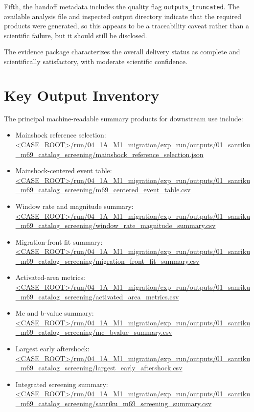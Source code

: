 \documentclass[11pt]{article}
\begin{document}
Fifth, the handoff metadata includes the quality flag \texttt{outputs\_truncated}. The available analysis file and inspected output directory indicate that the required products were generated, so this appears to be a traceability caveat rather than a scientific failure, but it should still be disclosed.

The evidence package characterizes the overall delivery status as complete and scientifically satisfactory, with moderate scientific confidence.

\section{Key Output Inventory}
The principal machine-readable summary products for downstream use include:
\begin{itemize}[leftmargin=2em]
    \item Mainshock reference selection: \url{<CASE_ROOT>/run/04_1A_M1_migration/exp_run/outputs/01_sanriku_m69_catalog_screening/mainshock_reference_selection.json}
    \item Mainshock-centered event table: \url{<CASE_ROOT>/run/04_1A_M1_migration/exp_run/outputs/01_sanriku_m69_catalog_screening/m69_centered_event_table.csv}
    \item Window rate and magnitude summary: \url{<CASE_ROOT>/run/04_1A_M1_migration/exp_run/outputs/01_sanriku_m69_catalog_screening/window_rate_magnitude_summary.csv}
    \item Migration-front fit summary: \url{<CASE_ROOT>/run/04_1A_M1_migration/exp_run/outputs/01_sanriku_m69_catalog_screening/migration_front_fit_summary.csv}
    \item Activated-area metrics: \url{<CASE_ROOT>/run/04_1A_M1_migration/exp_run/outputs/01_sanriku_m69_catalog_screening/activated_area_metrics.csv}
    \item Mc and b-value summary: \url{<CASE_ROOT>/run/04_1A_M1_migration/exp_run/outputs/01_sanriku_m69_catalog_screening/mc_bvalue_summary.csv}
    \item Largest early aftershock: \url{<CASE_ROOT>/run/04_1A_M1_migration/exp_run/outputs/01_sanriku_m69_catalog_screening/largest_early_aftershock.csv}
    \item Integrated screening summary: \url{<CASE_ROOT>/run/04_1A_M1_migration/exp_run/outputs/01_sanriku_m69_catalog_screening/sanriku_m69_screening_summary.csv}
\end{itemize}
\end{document}
